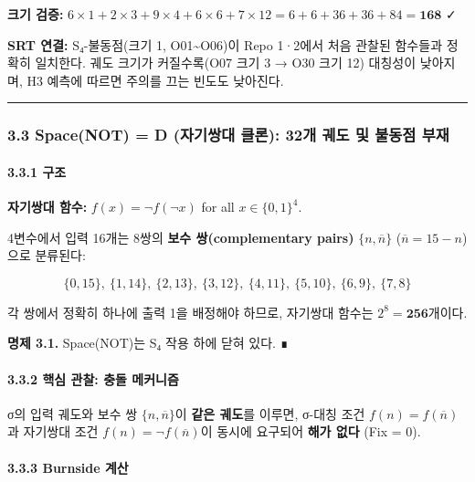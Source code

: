 \documentclass[
]{article}
\begin{document}
\textbf{크기 검증:}
\(6 \times 1 + 2 \times 3 + 9 \times 4 + 6 \times 6 + 7 \times 12 = 6+6+36+36+84 = \mathbf{168}\)
✓

\textbf{SRT 연결:} S₄-불동점(크기 1, O01\textasciitilde O06)이 Repo
1·2에서 처음 관찰된 함수들과 정확히 일치한다. 궤도 크기가 커질수록(O07
크기 3 → O30 크기 12) 대칭성이 낮아지며, H3 예측에 따르면 주의를 끄는
빈도도 낮아진다.

\begin{center}\rule{0.5\linewidth}{0.5pt}\end{center}

\subsubsection{3.3 Space(NOT) = D (자기쌍대 클론): 32개 궤도 및 불동점
부재}\label{spacenot-d-uxc790uxae30uxc30duxb300-uxd074uxb860-32uxac1c-uxada4uxb3c4-uxbc0f-uxbd88uxb3d9uxc810-uxbd80uxc7ac}

\paragraph{3.3.1 구조}\label{uxad6cuxc870-2}

\textbf{자기쌍대 함수:} \(f(x) = \neg f(\neg x)\) for all
\(x \in \{0,1\}^4\).

4변수에서 입력 16개는 8쌍의 \textbf{보수 쌍(complementary pairs)}
\(\{n, \overline{n}\}\) (\(\overline{n} = 15 - n\))으로 분류된다:

\[\{0,15\},\ \{1,14\},\ \{2,13\},\ \{3,12\},\ \{4,11\},\ \{5,10\},\ \{6,9\},\ \{7,8\}\]

각 쌍에서 정확히 하나에 출력 1을 배정해야 하므로, 자기쌍대 함수는
\(2^8 = \mathbf{256}\)개이다.

\textbf{명제 3.1.} Space(NOT)는 S₄ 작용 하에 닫혀 있다. ∎

\paragraph{3.3.2 핵심 관찰: 충돌
메커니즘}\label{uxd575uxc2ec-uxad00uxcc30-uxcda9uxb3cc-uxba54uxcee4uxb2c8uxc998}

σ의 입력 궤도와 보수 쌍 \(\{n, \overline{n}\}\)이 \textbf{같은 궤도}를
이루면, σ-대칭 조건 \(f(n) = f(\overline{n})\)과 자기쌍대 조건
\(f(n) = \neg f(\overline{n})\)이 동시에 요구되어 \textbf{해가 없다}
(Fix = 0).

\paragraph{3.3.3 Burnside 계산}\label{burnside-uxacc4uxc0b0-2}
\end{document}
